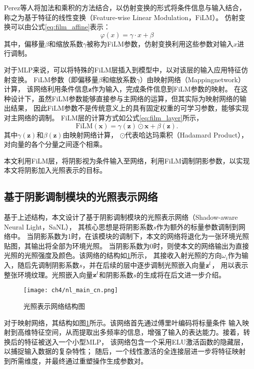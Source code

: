 Perez等人\cite{Perez_2018}将加法和乘积的方法结合，以仿射变换的形式将条件信息与输入结合，
称之为基于特征的线性变换（Feature-wise Linear Modulation，FiLM）。
仿射变换可以由公式\eqref{eq:film_affine}表示：
\begin{equation}
\label{eq:film_affine}
\varphi(x)=\gamma\cdot x+\beta
\end{equation}
其中，偏移量$\beta$和缩放系数$\gamma$被称为FiLM参数，仿射变换利用这些参数对输入$x$进行调制。

对于MLP来说，可以将特殊的FiLM层插入到模型中，以对该层的输入应用特征仿射变换。
FiLM参数（即偏移量$\beta$和缩放系数$\gamma$）由映射网络（Mappingnetwork）计算，
该网络利用条件信息$\mathbf{z}$作为输入，完成条件信息到FiLM参数的映射。
在这种设计下，虽然FiLM参数能够直接参与主网络的运算，但其实际为映射网络的输出结果，
因此FiLM参数不是传统意义上的具有固定权重的可学习参数，能够实现对主网络的调制。
FiLM层的计算方式如公式\eqref{eq:film_layer}所示，
\begin{equation}
\label{eq:film_layer}
\mathrm{FiLM}(\mathbf{x})=\gamma(\mathbf{z})\odot \mathbf{x}+\beta(\mathbf{z}).
\end{equation}
其中$\gamma(\mathbf{z})$和$\beta(\mathbf{z})$由映射网络计算，
$\odot$代表哈达玛乘积（Hadamard Product），对向量的各个分量之间逐个相乘。

本文利用FiLM层，将阴影视为条件输入至网络，利用FiLM调制阴影参数，以实现本文将阴影加入光照表示的目标。

\subsection{基于阴影调制模块的光照表示网络}

基于上述结构，本文设计了基于阴影调制模块的光照表示网络（Shadow-aware Neural Light，SaNL），
其核心思想是将阴影系数$s$作为额外的标量参数调制到网络中。
当阴影系数为1时，在该模块的调制下，本文的网络将退化为一张环境光照贴图，其输出将全部为环境光照。
当阴影系数为0时，则使本文的网络输出为直接光照的光照强度及颜色。该网络的结构如\ref{fig:nl_main_cn}所示，
其接收入射光照的方向$\omega_i$作为输入，随后先调制阴影系数$s$，并在后续的层中逐步调制光照嵌入向量${\bf{z}}^l$，
用以表示整张环境纹理。光照嵌入向量${\bf{z}}^l$和阴影系数$s$的生成将在后文进一步介绍。

\begin{figure}[htb]
  \centering
  \texttt{[image: ch4/nl\_main\_cn.png]}
  \caption{光照表示网络结构图}
  \label{fig:nl_main_cn}
\end{figure}

对于映射网络，其结构如图\ref{fig:nl_main_cn}所示。该网络首先通过傅里叶编码将标量条件
输入映射到高维特征空间，从而提取出多频率的信息，增强了输入的表达能力。接着，转换后的特征被送入一个小型MLP，
该网络包含一个采用ELU激活函数的隐藏层，以捕捉输入数据的复杂特性；
随后，一个线性激活的全连接层进一步将特征映射到所需维度，并最终通过重塑操作生成参数对。

